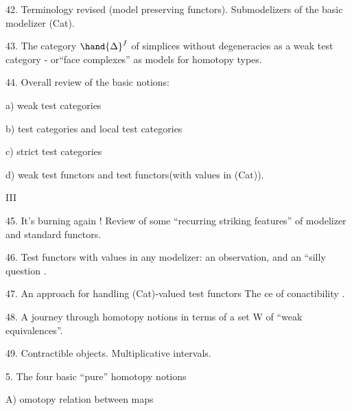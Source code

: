 42.  Terminology revised (model preserving functors).  Submodelizers of
the basic modelizer (Cat).

43.  The category $\hand{\Delta}^{f}$ of simplices without degeneracies as a weak test
category  -  or``face complexes'' as models for homotopy types.

44.  Overall review of the basic notions:

a)  weak test categories

b)  test categories and local test categories

c) strict test categories

d) weak test functors and test functors(with values in (Cat)).

   \hand{)}
III \hand{(}

45.  It's burning again ! Review of some ``recurring striking features''
of modelizer\hand{,} and  standard   functors.

\hand{(}46.\hand{)} Test functors with values in any modelizer: an observation, and an 
``silly question .

47.  An approach for handling (Cat)-valued test functors\hand{,}  The %
ce of conactibility .

48. \deleted{(}A journey through  homotopy notions\hand{,} \unsure{\deleted{(}}in terms of a set W of ``weak
equivalences''\deleted{)}.

49.  Contractible objects.  Multiplicative intervals.

\hand{(}5.\hand{)} The four basic ``pure'' homotopy notions   

A) omotopy relation between maps

